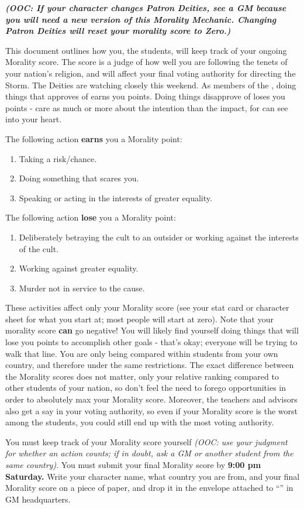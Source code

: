 \documentclass[green]{GL2020}
\begin{document}
\name{\gFoGStudentMorality{}}
\emph{\textbf{(OOC: If your character changes Patron Deities, see a GM because you will need a new version of this Morality Mechanic. Changing Patron Deities will reset your morality score to Zero.)}}

This document outlines how you, the students, will keep track of your ongoing Morality score. The score is a judge of how well you are following the tenets of your nation’s religion, and will affect your final voting authority for directing the Storm. The Deities are watching closely this weekend. As members of the \pGoaties{}, doing things that \cGenesis{} approves of earns you points. Doing things \cGenesis{\they} disapprove\cGenesis{\plural} of loses you points - \cGenesis{\they} care as much or more about the intention than the impact, for \cGenesis{\they} can see into your heart.

The following action \textbf{earns} you a Morality point:
\begin{enumerate}
  \item Taking a risk/chance.
  \item Doing something that scares you.
  \item Speaking or acting in the interests of greater equality.
\end{enumerate}

The following action \textbf{lose} you a Morality point:
\begin{enumerate}
  \item Deliberately betraying the cult to an outsider or working against the interests of the cult.
  \item Working against greater equality.
  \item Murder not in service to the cause.
\end{enumerate}

These activities affect only your Morality score (see your stat card or character sheet for what you start at; most people will start at zero).  Note that your morality score \textbf{can} go negative! You will likely find yourself doing things that will lose you points to accomplish other goals - that’s okay; everyone will be trying to walk that line. You are only being compared within students from your own country, and therefore under the same restrictions. The exact difference between the Morality scores does not matter, only your relative ranking compared to other students of your nation, so don’t feel the need to forego opportunities in order to absolutely max your Morality score. Moreover, the teachers and advisors also get a say in your voting authority, so even if your Morality score is the worst among the students, you could still end up with the most voting authority. 

You must keep track of your Morality score yourself \emph{(OOC: use your judgment for whether an action counts; if in doubt, ask a GM or another student from the same country)}. You must submit your final Morality score by \textbf{9:00 pm Saturday.} Write your character name, what country you are from, and your final Morality score on a piece of paper, and drop it in the envelope attached to “\sSignV{}” in GM headquarters. 
\end{document}
